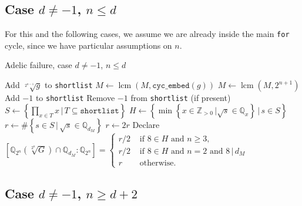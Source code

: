 \documentclass[10pt,a4paper]{report}
\DeclareMathOperator{\lcm}{lcm}
\theoremstyle{definition}
\begin{document}
\subsection*{Case $d\neq -1$, $n\leq d$}
For this and the following cases, we assume we are already inside the main \texttt{for} cycle, since we have particular assumptions on $n$.
\begin{algorithm}
\caption{Adelic failure, case $d\neq -1$, $n\leq d$}
\begin{algorithmic}
\State Add $\sqrt[2^{n-1}]{g}$ to \texttt{shortlist}
\State $M\leftarrow\lcm(M,\texttt{cyc\_embed}(g))$
\EndFor
\State
\State $M\leftarrow\lcm(M,2^{n+1})$
\State
{}
\State Add $-1$ to \texttt{shortlist}
\EndIf
\State
{}
\State Remove $-1$ from \texttt{shortlist} (if present)
\EndIf
\State
{}
\State $S\leftarrow\left\{\prod_{x\in T}x\,|\,T\subseteq\texttt{shortlist}\right\}$
\State $H\leftarrow\left\{\min\left\{x\in\mathbb{Z}_{>0}\,|\sqrt{s}\in \mathbb{Q}_x\right\}\,|\,s\in S\right\}$
\State $r\leftarrow\# \left\{s\in S\,|\, \sqrt{s}\in\mathbb{Q}_{d_M}\right\}$
\State
{}
\State $r\leftarrow 2r$
\EndIf
\State Declare $\left[\mathbb{Q}_{2^n}\left(\sqrt[2^n]{G}\right)\cap \mathbb{Q}_{d_M}:\mathbb{Q}_{2^n}\right]=\begin{cases}
r/2&\text{ if }8\in H\text{ and }n\geq 3,\\
r/2&\text{ if }8\in H\text{ and }n=2\text{ and }8\,|\,d_M\\
r&\text{ otherwise}.
\end{cases}$
\EndFor
\end{algorithmic}

\end{algorithm}


\pagebreak
\subsection*{Case $d\neq -1$, $n\geq d+2$}
\end{document}
